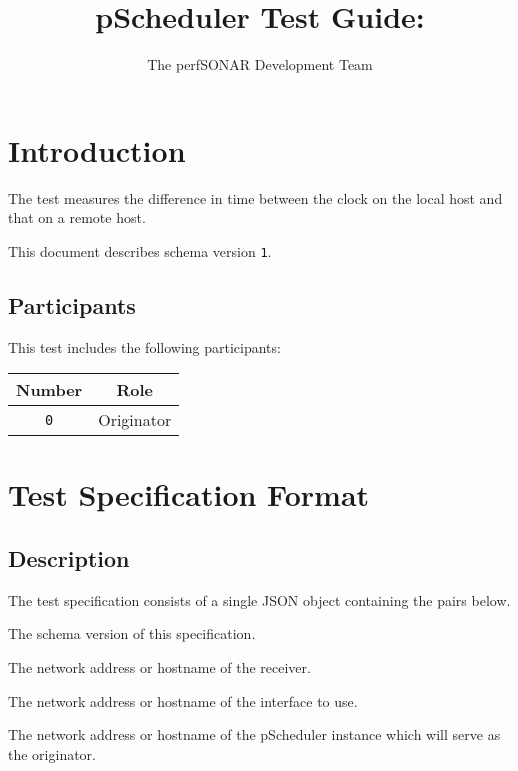 \documentclass[10pt]{article}
\title{pScheduler Test Guide: {\it \testname}}
\author{The perfSONAR Development Team}
\begin{document}
\maketitle


%
%

\section{Introduction}

The {\tt \testname} test measures the difference in time between the
clock on the local host and that on a remote host.

This document describes schema version {\tt 1}.


\subsection{Participants}

This test includes the following participants:

\begin{center}
\begin{tabular}{|c|c|}
\hline
{\bf Number} & {\bf Role} \\
\hline
{\tt 0} & Originator \\
\hline
\end{tabular}
\end{center}



%
%

\section{Test Specification Format}

\subsection{Description}

The test specification consists of a single JSON object containing the
pairs below.  \seejson

 The schema version of this specification.

 The network address or hostname of the receiver.

 The network address or hostname of the
interface to use.

 The network address or hostname of the
pScheduler instance which will serve as the originator.
\end{document}
